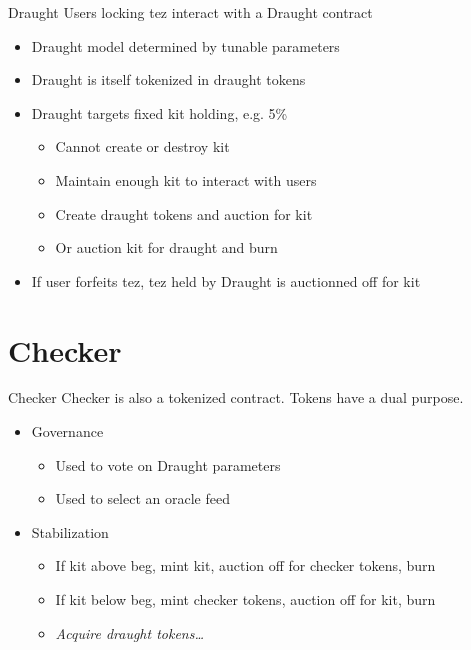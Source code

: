 \documentclass[handout]{beamer}
\newcommand{\yel}[
  1]{{\color{yellow} #1}}
\begin{document}
\begin{frame}{Draught}
  Users locking tez interact with a \yel{Draught} contract
  \begin{itemize}
  \item Draught model determined by tunable parameters
  \item Draught is itself \yel{tokenized} in draught tokens
  \item Draught targets fixed kit holding, e.g. 5\%
    \begin{itemize}
    \item Cannot create or destroy kit
    \item Maintain enough kit to interact with users
    \item Create draught tokens and auction for kit
    \item Or auction kit for draught and burn
    \end{itemize}
  \item If user forfeits tez, tez held by Draught is auctionned off for kit
  \end{itemize}
\end{frame}

\section{Checker}

\begin{frame}{Checker}
  Checker is also a tokenized contract. Tokens have a dual purpose.
  \begin{itemize}
    \item \yel{Governance}
      \begin{itemize}
      \item Used to vote on Draught parameters
      \item Used to select an oracle feed
      \end{itemize}
    \item \yel{Stabilization}
      \begin{itemize}
      \item If kit above beg, \yel{mint kit}, auction off for checker tokens, burn
      \item If kit below beg, \yel{mint checker tokens}, auction off for kit, burn
      \item \emph{Acquire draught tokens\ldots}
      \end{itemize}
  \end{itemize}      
\end{frame}
\end{document}
